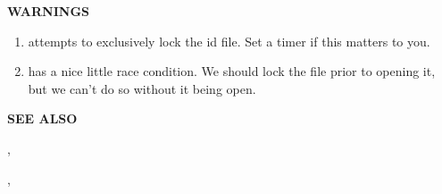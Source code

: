 {\bf WARNINGS}

\begin{enumerate}

\item {} attempts to exclusively lock the id file.
Set a timer if this matters to you.

\item {} has a nice little race condition.  We should lock
the file prior to opening it, but we can't do so without it being open.

\end{enumerate}

{\bf SEE ALSO}

,

,

